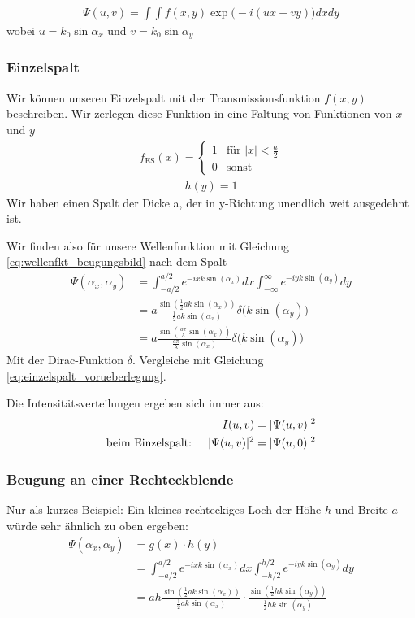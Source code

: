 \documentclass[a4paper]{article}
\begin{document}
\begin{align}
\Psi (u,v) = \int \int f(x,y) \exp\Big(-i(ux+vy)\Big) dx dy
\label{eq:wellenfkt_beugungsbild}
\end{align}
wobei $u= k_0 \sin\alpha_x$ und $v=k_0\sin\alpha_y$
\subsubsection{Einzelspalt}
Wir können unseren Einzelspalt mit der Transmissionsfunktion $f(x,y)$ beschreiben. Wir zerlegen diese Funktion in eine Faltung von Funktionen von $x$ und $y$
\begin{align}
f_\text{ES}(x) = \begin{cases} 
1  &\text{für } |x| <  \frac{a}{2} \\
0 & \text{sonst}\end{cases}
\label{eq:einzelspalt}
\end{align}
\begin{align}
h(y) = 1
\end{align}
Wir haben einen Spalt der Dicke a, der in y-Richtung unendlich weit ausgedehnt ist.

Wir finden also für unsere Wellenfunktion mit Gleichung \ref{eq:wellenfkt_beugungsbild} nach dem Spalt
\begin{align}
\Psi(\alpha_x,\alpha_y) &= \int_{-a/2}^{a/2} e^{-ixk\sin(\alpha_x)} dx \int_{-\infty}^\infty e^{-iyk\sin(\alpha_y)}dy\\
&= a \frac{\sin(\frac{1}{2} ak\sin(\alpha_x))}{\frac{1}{2} ak\sin(\alpha_x)}\delta\Big(k \sin(\alpha_y)\Big)\\
&= a \frac{\sin( \frac{a\pi}{\lambda} \sin(\alpha_x))}{\frac{a\pi}{\lambda} \sin(\alpha_x)}\delta\Big(k \sin(\alpha_y)\Big)
\end{align}
Mit der Dirac-Funktion $\delta$. Vergleiche mit Gleichung \ref{eq:einzelspalt_vorueberlegung}.

Die Intensitätsverteilungen ergeben sich immer aus:
\begin{align}
I(u,v) &= |\Psi(u,v)|^2\\
\text{beim Einzelspalt: \quad}
|\Psi(u,v)|^2 &= |\Psi(u,0)|^2 
\end{align}
\subsubsection{Beugung an einer Rechteckblende}
Nur als kurzes Beispiel: Ein kleines rechteckiges Loch der Höhe $h$ und Breite $a$ würde sehr ähnlich zu oben ergeben:
\begin{align}
\Psi(\alpha_x,\alpha_y) &= g(x) \cdot h(y) \\
&= \int_{-a/2}^{a/2} e^{-ixk\sin(\alpha_x)} dx \int_{-h/2}^{h/2} e^{-iyk\sin(\alpha_y)}dy\\
&= ah \frac{\sin(\frac{1}{2} ak\sin(\alpha_x))}{\frac{1}{2} ak\sin(\alpha_x)} \cdot \frac{\sin(\frac{1}{2} hk\sin(\alpha_y))}{\frac{1}{2} hk\sin(\alpha_y)}\\
\end{align}
\end{document}

